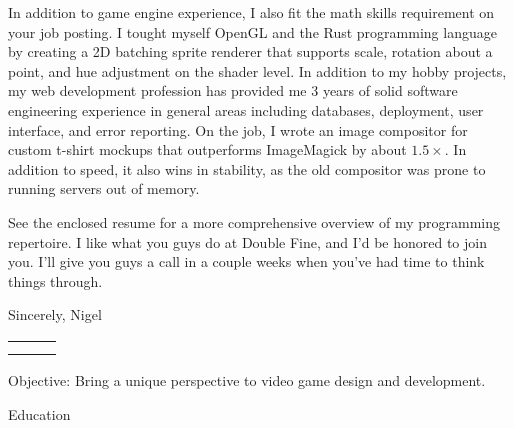 \documentclass[12pt]{article}
\def \author{Nigel Baillie}
\renewcommand{\section}[1]{{\Huge{#1}}\vspace{2 mm}}
\begin{document}
In addition to game engine experience, I also fit the math skills requirement on your job posting.
I tought myself OpenGL and the Rust programming language by creating
a 2D batching sprite renderer that supports scale, rotation about a point, and
hue adjustment on the shader level. In addition to my hobby projects, my web development
profession has provided me 3 years of solid
software engineering experience in general areas including databases, deployment, user
interface, and error reporting. On the job, I wrote an image compositor for custom t-shirt
mockups that outperforms ImageMagick by about $1.5\times$. In addition to speed, it also
wins in stability, as the old compositor was prone to running servers out of memory.
\newline

See the enclosed resume for a more
comprehensive overview of my programming repertoire. I like what you guys do at
Double Fine, and I'd be honored to join you. I'll give you guys
a call in a couple weeks when you've had time to think things through.
\newline

Sincerely,
\newline
Nigel


\pagebreak


\begin{tabular} {
  p{}
  p{}
  p{}
}
  \begin{flushleft}
  \end{flushleft}
  &
  \begin{center}
    {\Huge{\author}}\\
  \end{center}
  &
  \begin{flushright}
  \end{flushright}
\end{tabular}

\section{Objective:} Bring a unique perspective to video game design and development.
\newline

\section{Education}
\hline
\end{document}
